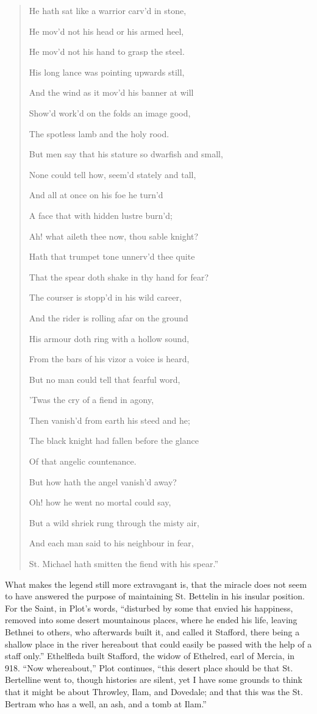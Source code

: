 \begin{quote}
He hath sat like a warrior carv'd in stone,

He mov'd not his head or his armed heel,

He mov'd not his hand to grasp the steel.

His long lance was pointing upwards still,

And the wind as it mov'd his banner at will

Show'd work'd on the folds an image good,

The spotless lamb and the holy rood.

But men say that his stature so dwarfish and small,

None could tell how, seem'd stately and tall,

And all at once on his foe he turn'd

A face that with hidden lustre burn'd;

Ah! what aileth thee now, thou sable knight?

Hath that trumpet tone unnerv'd thee quite

That the spear doth shake in thy hand for fear?

The courser is stopp'd in his wild career,

And the rider is rolling afar on the ground

His armour doth ring with a hollow sound,

From the bars of his vizor a voice is heard,

But no man could tell that fearful word,

'Twas the cry of a fiend in agony,

Then vanish'd from earth his steed and he; 

The black knight had fallen before the glance

Of that angelic countenance.

But how hath the angel vanish'd away?

Oh! how he went no mortal could say,

But a wild shriek rung through the misty air,

And each man said to his neighbour in fear,

St. Michael hath smitten the fiend with his spear.''

\end{quote}

What makes the legend still more extravagant is,
that the miracle does not seem to have answered the purpose of
maintaining St. Bettelin in his insular position. For the Saint, in
Plot's words, ``disturbed by some that envied his happiness, removed
into some desert mountainous places, where he ended his life, leaving
Bethnei to others, who afterwards built it, and called it Stafford,
there being a shallow place in the river hereabout that could easily
be passed with the help of a staff only.'' Ethelfleda built Stafford,
the widow of Ethelred, earl of Mercia, in 918. ``Now whereabout,'' Plot
continues, ``this desert place should be that St. Bertelline went to,
though histories are silent, yet I have some grounds to think that it
might be about Throwley, Ilam, and Dovedale; and that this was the St.
Bertram who has a well, an ash, and a tomb at Ilam.''

